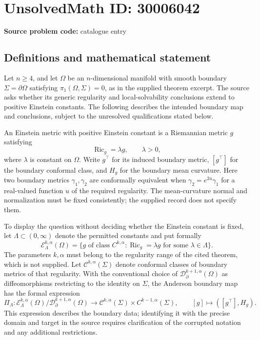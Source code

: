 \documentclass[11pt]{article}
\begin{document}
\section*{UnsolvedMath ID: 30006042}
\textbf{Source problem code:} catalogue entry
\subsection{Definitions and mathematical statement}
Let \(n\geq4\), and let \(\Omega\) be an \(n\)-dimensional manifold with smooth boundary \(\Sigma=\partial\Omega\) satisfying \(\pi_1(\Omega,\Sigma)=0\), as in the supplied theorem excerpt. The source asks whether its generic regularity and local-solvability conclusions extend to positive Einstein constants. The following describes the intended boundary map and conclusions, subject to the unresolved qualifications stated below.

An Einstein metric with positive Einstein constant is a Riemannian metric \(g\) satisfying
\[
\operatorname{Ric}_g=\lambda g,\qquad \lambda>0,
\]
where \(\lambda\) is constant on \(\Omega\). Write \(g^\top\) for its induced boundary metric, \([g^\top]\) for the boundary conformal class, and \(H_g\) for the boundary mean curvature. Here two boundary metrics \(\gamma_1,\gamma_2\) are conformally equivalent when \(\gamma_2=e^{2u}\gamma_1\) for a real-valued function \(u\) of the required regularity. The mean-curvature normal and normalization must be fixed consistently; the supplied record does not specify them.

To display the question without deciding whether the Einstein constant is fixed, let \(\Lambda\subset(0,\infty)\) denote the permitted constants and put formally
\[
\mathcal E^{k,\alpha}_{\Lambda}(\Omega)
=\{g\text{ of class }C^{k,\alpha}:\operatorname{Ric}_g=\lambda g\text{ for some }\lambda\in\Lambda\}.
\]
The parameters \(k,\alpha\) must belong to the regularity range of the cited theorem, which is not supplied. Let \(\mathcal C^{k,\alpha}(\Sigma)\) denote conformal classes of boundary metrics of that regularity. With the conventional choice of \(\mathcal D^{k+1,\alpha}_{\partial}(\Omega)\) as diffeomorphisms restricting to the identity on \(\Sigma\), the Anderson boundary map has the formal expression
\[
\Pi_{\Lambda}:\mathcal E^{k,\alpha}_{\Lambda}(\Omega)/\mathcal D^{k+1,\alpha}_{\partial}(\Omega)
\longrightarrow
\mathcal C^{k,\alpha}(\Sigma)\times C^{k-1,\alpha}(\Sigma),
\qquad
[g]\longmapsto([g^\top],H_g).
\]
This expression describes the boundary data; identifying it with the precise domain and target in the source requires clarification of the corrupted notation and any additional restrictions.
\end{document}
